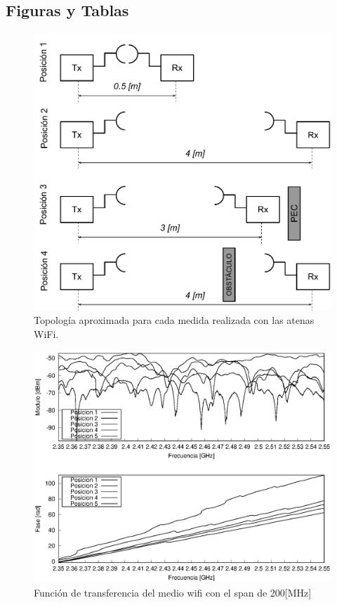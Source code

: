 \documentclass[10pt,conference,a4paper]{IEEEtran}
\begin{document}
\subsection{Figuras y Tablas}
\begin{figure}[htb]
    \centering
    \includegraphics[width=\columnwidth]{figuras/posicion_antenas_wifi.pdf}
    \caption{Topología aproximada para cada medida realizada con las atenas WiFi.}
    \label{fig:posiciones_wifi}
\end{figure}
\begin{figure}[htb]
    \centering
    \includegraphics[width=\columnwidth]{figuras/funcion_transferencia_wifi.eps}
    \caption{Función de transferencia del medio wifi con el span de 200[MHz]}
    \label{fig:transferencia_wifi}
\end{figure}
\end{document}
